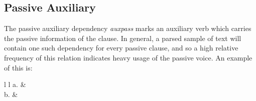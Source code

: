 \documentclass[main.tex]{subfiles}
\begin{document}

\subsection{Passive Auxiliary}

The passive auxiliary dependency \textit{auxpass} marks an auxiliary verb which carries the passive information of the clause. In general, a parsed sample of text will contain one such dependency for every passive clause, and so a high relative frequency of this relation indicates heavy usage of the passive voice. An example 
\citep{typed-deps-manual} of this is:
\newline\newline\begin{tabular}{ l l }
a. & \\
b. & 
\end{tabular}
\newline
\end{document}

